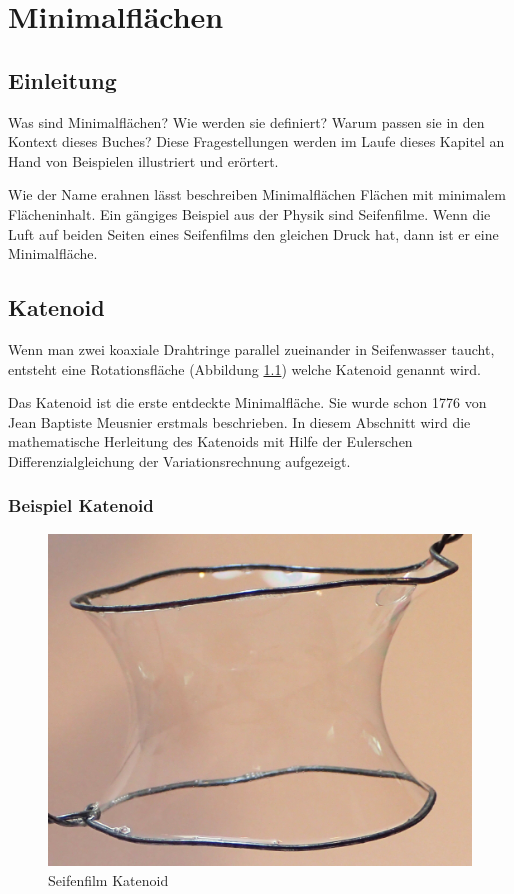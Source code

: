 \chapter{Minimalflächen\label{chapter:minimal}}
\begin{refsection}

\section{Einleitung}
Was sind Minimalflächen? 
Wie werden sie definiert? 
Warum passen sie in den Kontext dieses Buches?
Diese Fragestellungen werden im Laufe dieses Kapitel an Hand von Beispielen illustriert und erörtert.

Wie der Name erahnen lässt beschreiben Minimalflächen Flächen mit minimalem Flächeninhalt. 
Ein gängiges Beispiel aus der Physik sind Seifenfilme. Wenn die Luft auf beiden Seiten eines Seifenfilms den gleichen Druck hat, dann ist er eine Minimalfläche.


\section{Katenoid}
Wenn man zwei koaxiale Drahtringe parallel zueinander in Seifenwasser taucht, entsteht eine Rotationsfläche (Abbildung \ref{KatenoidSeifenfilm}) welche Katenoid genannt wird. 

Das Katenoid ist die erste entdeckte Minimalfläche.
Sie wurde schon 1776 von Jean Baptiste Meusnier erstmals beschrieben.
In diesem Abschnitt wird die mathematische Herleitung des Katenoids mit Hilfe der Eulerschen Differenzialgleichung der Variationsrechnung aufgezeigt.
\subsection{Beispiel Katenoid}

\begin{figure}
  \centering
  \includegraphics[scale=0.5]{minimal/Cartenoid_Foto.png}
  \caption{Seifenfilm Katenoid} 
  \label{KatenoidSeifenfilm}
\end{figure}



\end{refsection}
